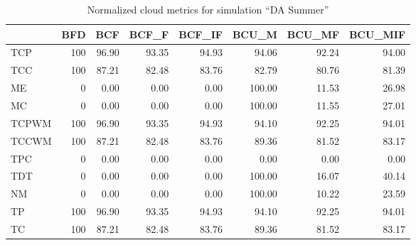 \begin{table}[ht]
\centering
\begin{tabular}{lrrrrrrr}
\toprule
{} &  BFD &    BCF &  BCF\_F &  BCF\_IF &   BCU\_M &  BCU\_MF &  BCU\_MIF \\
\midrule
TCP   &  100 &  96.90 &  93.35 &   94.93 &   94.06 &   92.24 &    94.00 \\
TCC   &  100 &  87.21 &  82.48 &   83.76 &   82.79 &   80.76 &    81.39 \\
ME    &    0 &   0.00 &   0.00 &    0.00 &  100.00 &   11.53 &    26.98 \\
MC    &    0 &   0.00 &   0.00 &    0.00 &  100.00 &   11.55 &    27.01 \\
TCPWM &  100 &  96.90 &  93.35 &   94.93 &   94.10 &   92.25 &    94.01 \\
TCCWM &  100 &  87.21 &  82.48 &   83.76 &   89.36 &   81.52 &    83.17 \\
TPC   &    0 &   0.00 &   0.00 &    0.00 &    0.00 &    0.00 &     0.00 \\
TDT   &    0 &   0.00 &   0.00 &    0.00 &  100.00 &   16.07 &    40.14 \\
NM    &    0 &   0.00 &   0.00 &    0.00 &  100.00 &   10.22 &    23.59 \\
TP    &  100 &  96.90 &  93.35 &   94.93 &   94.10 &   92.25 &    94.01 \\
TC    &  100 &  87.21 &  82.48 &   83.76 &   89.36 &   81.52 &    83.17 \\
\bottomrule
\end{tabular}
\caption{Normalized cloud metrics for simulation "`DA Summer"'}
\end{table}

